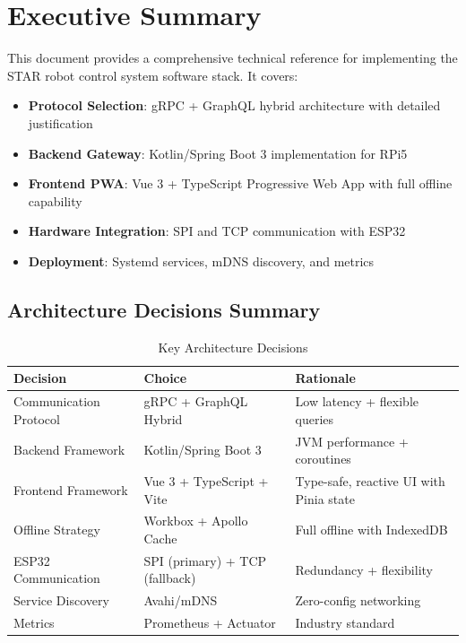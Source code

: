 \documentclass[11pt,letterpaper]{article}
\begin{document}
\newpage

\section{Executive Summary}

This document provides a comprehensive technical reference for implementing the STAR robot control system software stack. It covers:

\begin{itemize}
    \item \textbf{Protocol Selection}: gRPC + GraphQL hybrid architecture with detailed justification
    \item \textbf{Backend Gateway}: Kotlin/Spring Boot 3 implementation for RPi5
    \item \textbf{Frontend PWA}: Vue 3 + TypeScript Progressive Web App with full offline capability
    \item \textbf{Hardware Integration}: SPI and TCP communication with ESP32
    \item \textbf{Deployment}: Systemd services, mDNS discovery, and metrics
\end{itemize}

\subsection{Architecture Decisions Summary}

\begin{table}[H]
\centering
\begin{tabular}{|l|l|l|}
\hline
\textbf{Decision} & \textbf{Choice} & \textbf{Rationale} \\
\hline
Communication Protocol & gRPC + GraphQL Hybrid & Low latency + flexible queries \\
Backend Framework & Kotlin/Spring Boot 3 & JVM performance + coroutines \\
Frontend Framework & Vue 3 + TypeScript + Vite & Type-safe, reactive UI with Pinia state \\
Offline Strategy & Workbox + Apollo Cache & Full offline with IndexedDB \\
ESP32 Communication & SPI (primary) + TCP (fallback) & Redundancy + flexibility \\
Service Discovery & Avahi/mDNS & Zero-config networking \\
Metrics & Prometheus + Actuator & Industry standard \\
\hline
\end{tabular}
\caption{Key Architecture Decisions}
\end{table}
\end{document}
